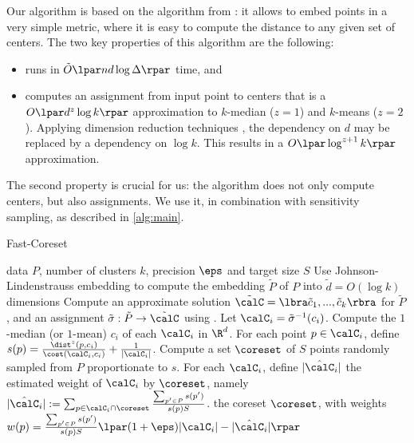 Our algorithm is based on the \fkmeans algorithm from \cite{cohen2020fast}: it allows to embed points in a very simple metric,  where it is easy to compute the
distance to any given set of centers. The two key properties of this algorithm are the following: 
\begin{itemize}
\item \fkmeans runs in $\tilde O\lpar n d \log \Delta\rpar$ time, and
\item \fkmeans computes an assignment from input point to centers that is a $O\lpar d^z \log k\rpar$ approximation to $k$-median ($z=1$) and
$k$-means ($z=2$). Applying dimension reduction techniques \cite{MakarychevMR19}, the dependency on $d$ may be replaced by a dependency on $\log k$. This results in a $O\lpar\log^{z+1} k\rpar$ approximation.
\end{itemize}

The second property is crucial for us: the algorithm does not only compute centers, but also assignments. 
  We use it, in combination with sensitivity sampling, as described in \cref{alg:main}.


\begin{algorithm}[tb]
   \caption{Fast-Coreset}
   \label{alg:main}
\begin{algorithmic}
    data $P$, number of clusters $k$, precision $\eps$ and target size $S$
   \STATE Use Johnson-Lindenstrauss embedding to compute the embedding $\tilde P$ of $P$ into $\tilde d = O(\log k)$ dimensions
   \STATE Compute an approximate solution $\tilde \calC = \lbra \tilde c_1, ..., \tilde c_k\rbra $ for $\tilde P$, and an assignment $\tilde \sigma : \tilde P \rightarrow \tilde \calC$ using \fkmeans.	
   \STATE Let $\calC_i = \tilde \sigma^{-1}(c_i)$.
   \STATE Compute the $1$-median (or $1$-mean) $c_i$ of each $\calC_i$ in $\R^d$.%
   \STATE For each point $p \in \calC_i$, define
   $s(p) = \frac{\dist^z(p, c_i)}{\cost(\calC_i, c_i)}+ \frac{1}{|\calC_i|}$.
   \STATE Compute a set $\coreset$ of $S$ points randomly sampled from $P$ proportionate to $s$.
   \STATE For each $\calC_i$, define $|\hat \calC_i|$ the estimated weight of $\calC_i$ by $\coreset$, namely $|\hat \calC_i| := \sum_{p \in \calC_i \cap \coreset} \frac{\sum_{p' \in P}s(p')}{s(p)S}$.
    the coreset $\coreset$, with weights $w(p) = \frac{\sum_{p' \in P}s(p')}{s(p)S} \lpar (1+\eps)|\calC_i| - |\hat \calC_i|\rpar$
\end{algorithmic}
\end{algorithm}


